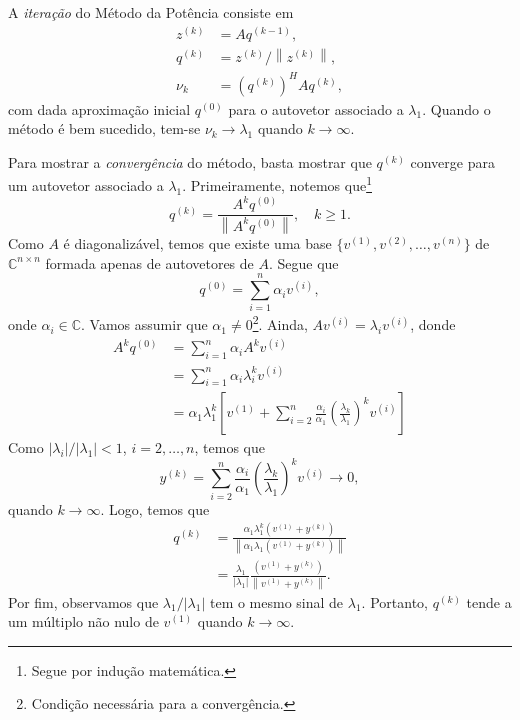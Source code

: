 A \emph{iteração} do Método da Potência consiste em
\begin{align}
  z^{(k)} &= Aq^{(k-1)},\\
  q^{(k)} &= z^{(k)}/\left\|z^{(k)}\right\|,\\
  \nu_k &= (q^{(k)})^H A q^{(k)},
\end{align}
com dada aproximação inicial $q^{(0)}$ para o autovetor associado a $\lambda_1$. Quando o método é bem sucedido, tem-se $\nu_k\to \lambda_1$ quando $k\to\infty$.

Para mostrar a \emph{convergência} do método, basta mostrar que $q^{(k)}$ converge para um autovetor associado a $\lambda_1$. Primeiramente, notemos que\footnote{Segue por indução matemática.}
\begin{equation}
  q^{(k)} = \frac{A^kq^{(0)}}{\left\|A^kq^{(0)}\right\|},\quad k\geq 1.
\end{equation}
Como $A$ é diagonalizável, temos que existe uma base $\{v^{(1)}, v^{(2)}, \dotsc, v^{(n)}\}$ de $\mathbb{C}^{n\times n}$ formada apenas de autovetores de $A$. Segue que
\begin{equation}
  q^{(0)} = \sum_{i=1}^n \alpha_i v^{(i)},
\end{equation}
onde $\alpha_i\in\mathbb{C}$. Vamos assumir que $\alpha_1\neq 0$\footnote{Condição necessária para a convergência.}. Ainda, $Av^{(i)} = \lambda_i v^{(i)}$, donde
\begin{align}
  A^kq^{(0)} &= \sum_{i=1}^n \alpha_iA^kv^{(i)}\\
             &= \sum_{i=1}^n \alpha_i\lambda_i^kv^{(i)}\\
             &= \alpha_1\lambda_1^k\left[v^{(1)} + \sum_{i=2}^n\frac{\alpha_i}{\alpha_1}\left(\frac{\lambda_k}{\lambda_1}\right)^kv^{(i)}\right]
\end{align}
Como $|\lambda_i|/|\lambda_1| < 1$, $i=2,\dotsc,n$, temos que
\begin{equation}
  y^{(k)} = \sum_{i=2}^n\frac{\alpha_i}{\alpha_1}\left(\frac{\lambda_k}{\lambda_1}\right)^kv^{(i)} \to 0,
\end{equation}
quando $k\to \infty$. Logo, temos que
\begin{align}
  q^{(k)} &= \frac{\alpha_1\lambda_1^k\left(v^{(1)}+y^{(k)}\right)}{\left\|\alpha_1\lambda_1\left(v^{(1)}+y^{(k)}\right)\right\|}\\
          &= \frac{\lambda_1}{|\lambda_1|}\frac{\left(v^{(1)}+y^{(k)}\right)}{\left\|v^{(1)}+y^{(k)}\right\|}.
\end{align}
Por fim, observamos que $\lambda_1/|\lambda_1|$ tem o mesmo sinal de $\lambda_1$. Portanto, $q^{(k)}$ tende a um múltiplo não nulo de $v^{(1)}$ quando $k\to\infty$.

